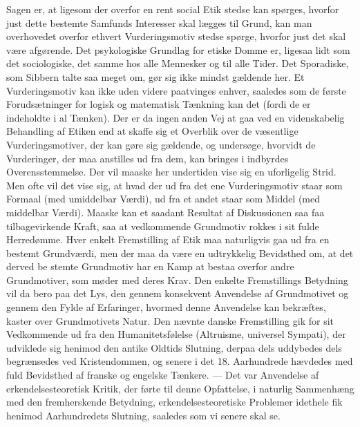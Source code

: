 \documentclass[12pt,a4paper,openany]{book}
\newcommand{\opage}[1]{\marginnote{\footnotesize\textit{[#1]}}}
\begin{document}
Sagen er, at ligesom der overfor en rent social Etik stedse kan
spørges, hvorfor just dette bestemte Samfunds Interesser skal lægges
til Grund, kan man overhovedet overfor ethvert Vurderingsmotiv
stedse spørge, hvorfor just det skal være afgørende. Det psykologiske
Grundlag for etiske Domme er, ligesaa lidt som det sociologiske,
det samme hos alle Mennesker og til alle Tider. Det Sporadiske,
som Sibbern talte saa meget om, gør sig ikke mindst gældende
her. Et Vurderingsmotiv kan ikke uden videre paatvinges enhver,
saaledes som de første Forudsætninger for logisk og matematisk
Tænkning kan det (fordi de er indeholdte i al Tænken). Der er da
ingen anden Vej at gaa ved en videnskabelig Behandling af Etiken
end at skaffe sig et Overblik over de væsentlige Vurderingsmotiver,
der kan gøre sig gældende, og undersøge, hvorvidt de Vurderinger,
der maa anstilles ud fra dem, kan bringes i indbyrdes Overensstemmelse.
Der vil maaske her undertiden vise sig en uforligelig Strid.
Men ofte vil det vise sig, at hvad der ud fra det ene Vurderingsmotiv
staar som Formaal (med umiddelbar Værdi), ud fra et andet staar
som Middel (med middelbar Værdi). Maaske kan et saadant Resultat
af Diskussionen saa faa tilbagevirkende Kraft, saa at vedkommende
Grundmotiv rokkes i sit fulde Herredømme. Hver enkelt Fremstilling
af Etik maa naturligvis gaa ud fra en bestemt Grundværdi, men
der maa da være en udtrykkelig Bevidsthed om, at det derved be%
\opage{72}stemte Grundmotiv har en Kamp at bestaa overfor andre Grundmotiver,
som møder med deres Krav. Den enkelte Fremstillings Betydning
vil da bero paa det Lys, den gennem konsekvent Anvendelse
af Grundmotivet og gennem den Fylde af Erfaringer, hvormed denne
Anvendelse kan bekræftes, kaster over Grundmotivets Natur. Den
nævnte danske Fremstilling gik for sit Vedkommende ud fra den
Humanitetsfølelse (Altruisme, universel Sympati), der udviklede sig
henimod den antike Oldtids Slutning, derpaa dels uddybedes dels
begrænsedes ved Kristendommen, og senere i det 18. Aarhundrede
hævdedes med fuld Bevidsthed af franske og engelske Tænkere. ---
Det var Anvendelse af erkendelsesteoretisk Kritik, der førte til denne
Opfattelse, i naturlig Sammenhæng med den fremherskende Betydning,
erkendelsesteoretiske Problemer idethele fik henimod Aarhundredets
Slutning, saaledes som vi senere skal se.
\end{document}
